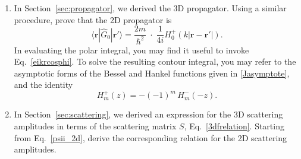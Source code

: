 \documentclass[pra,12pt]{revtex4}
\begin{document}
\begin{enumerate}
\item \label{ex:2dpropagator}
  In Section~\ref{sec:propagator}, we derived the 3D propagator.
  Using a similar procedure, prove that the 2D propagator is
  \begin{equation}
    \langle\mathbf{r}|\hat{G}_0|\mathbf{r}'\rangle = \frac{2m}{\hbar^2}\;
    \cdot\; \frac{1}{4i} H^+_0(k|\mathbf{r}-\mathbf{r'}|).
  \end{equation}
  In evaluating the polar integral, you may find it useful to invoke
  Eq.~\eqref{eikrcosphi}.  To solve the resulting contour integral,
  you may refer to the asymptotic forms of the Bessel and Hankel
  functions given in \eqref{Jasymptote}, and the identity
  \begin{equation}
    H_m^+(z) = - (-1)^m \, H_m^-(-z).
  \end{equation}

\item \label{ex:2dscattering} In Section~\ref{sec:scattering}, we
  derived an expression for the 3D scattering amplitudes in terms of
  the scattering matrix $S$, Eq.~\eqref{3dfrelation}.  Starting from
  Eq.~\eqref{psii_2d}, derive the corresponding relation for the 2D
  scattering amplitudes.

\end{enumerate}
\end{document}
